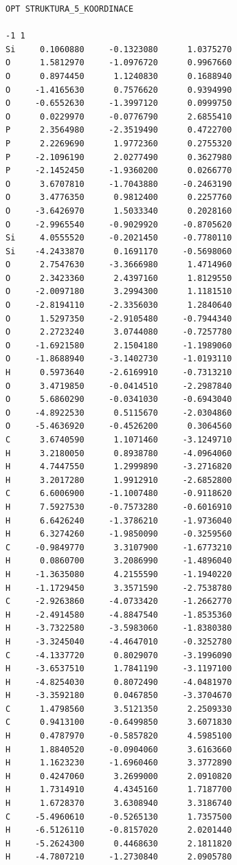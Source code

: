 \documentclass[
digital, %
table,   %
nolof,     %
nolot,     %
oneside,
]{fithesis3}
\begin{document}
\begin{lstlisting}[frame=single, caption={struktura koordinace 5},label=DescriptiveLabel]
OPT STRUKTURA_5_KOORDINACE

-1 1
Si     0.1060880     -0.1323080      1.0375270
O      1.5812970     -1.0976720      0.9967660
O      0.8974450      1.1240830      0.1688940
O     -1.4165630      0.7576620      0.9394990
O     -0.6552630     -1.3997120      0.0999750
O      0.0229970     -0.0776790      2.6855410
P      2.3564980     -2.3519490      0.4722700
P      2.2269690      1.9772360      0.2755320
P     -2.1096190      2.0277490      0.3627980
P     -2.1452450     -1.9360200      0.0266770
O      3.6707810     -1.7043880     -0.2463190
O      3.4776350      0.9812400      0.2257760
O     -3.6426970      1.5033340      0.2028160
O     -2.9965540     -0.9029920     -0.8705620
Si     4.0555520     -0.2021450     -0.7780110
Si    -4.2433870      0.1691170     -0.5698060
O      2.7547630     -3.3666980      1.4714960
O      2.3423360      2.4397160      1.8129550
O     -2.0097180      3.2994300      1.1181510
O     -2.8194110     -2.3356030      1.2840640
O      1.5297350     -2.9105480     -0.7944340
O      2.2723240      3.0744080     -0.7257780
O     -1.6921580      2.1504180     -1.1989060
O     -1.8688940     -3.1402730     -1.0193110
H      0.5973640     -2.6169910     -0.7313210
O      3.4719850     -0.0414510     -2.2987840
O      5.6860290     -0.0341030     -0.6943040
O     -4.8922530      0.5115670     -2.0304860
O     -5.4636920     -0.4526200      0.3064560
C      3.6740590      1.1071460     -3.1249710
H      3.2180050      0.8938780     -4.0964060
H      4.7447550      1.2999890     -3.2716820
H      3.2017280      1.9912910     -2.6852800
C      6.6006900     -1.1007480     -0.9118620
H      7.5927530     -0.7573280     -0.6016910
H      6.6426240     -1.3786210     -1.9736040
H      6.3274260     -1.9850090     -0.3259560
C     -0.9849770      3.3107900     -1.6773210
H      0.0860700      3.2086990     -1.4896040
H     -1.3635080      4.2155590     -1.1940220
H     -1.1729450      3.3571590     -2.7538780
C     -2.9263860     -4.0733420     -1.2662770
H     -2.4914580     -4.8847540     -1.8535360
H     -3.7322580     -3.5983060     -1.8380380
H     -3.3245040     -4.4647010     -0.3252780
C     -4.1337720      0.8029070     -3.1996090
H     -3.6537510      1.7841190     -3.1197100
H     -4.8254030      0.8072490     -4.0481970
H     -3.3592180      0.0467850     -3.3704670
C      1.4798560      3.5121350      2.2509330
C      0.9413100     -0.6499850      3.6071830
H      0.4787970     -0.5857820      4.5985100
H      1.8840520     -0.0904060      3.6163660
H      1.1623230     -1.6960460      3.3772890
H      0.4247060      3.2699000      2.0910820
H      1.7314910      4.4345160      1.7187700
H      1.6728370      3.6308940      3.3186740
C     -5.4960610     -0.5265130      1.7357500
H     -6.5126110     -0.8157020      2.0201440
H     -5.2624300      0.4468630      2.1811820
H     -4.7807210     -1.2730840      2.0905780

\end{lstlisting}
\end{document}
